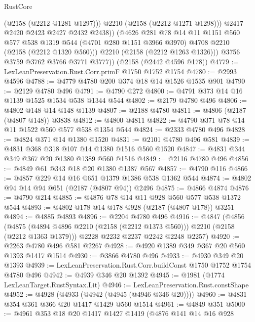 \begin{lexlean}{RustCore}
\begin{coremodule}
                  (@2158 (@2212 @1281 @1297)))
                @2210
                (@2158 (@2212 @1271 @1298)))
              @2417
              @2420
              @2423
              @2427
              @2432
              @2438))
          (@4626
            @281
            @78
            @14
            @11
            @1151
            @560
            @577
            @538
            @1319
            @544
            (@4701 @280 @1151 @3966 @3970)
            @4708
            @2210
            (@2158 (@2212 @1320 @560)))
          @2210
          (@2158 (@2212 @1263 @1326)))
        @3756
        @3759
        @3762
        @3766
        @3771
        @3777))
    (@2158 (@2442 @4596 @178))
@4779 := LexLeanPreservation.Rust.Corr.primF @1750 @1752 @1754
@4780 := @2993 @4596
@4788 := @4779 @4780 @200 @374 @18 @14 @1526 @1535 @901
@4790 := @2129 @4780 @496
@4791 := @4790 @272
@4800 := @4791 @373 @14 @16 @1139 @1525 @1534 @538 @1344 @544
@4802 := @2179 @4780 @496
@4806 := @4802 @148 @14 @148 @1139
@4807 := @2188 @4780
@4811 := @4806 (@2187 (@4807 @148)) @3838
@4812 := @4800 @4811
@4822 := @4790 @371 @78 @14 @11 @1522 @560 @577 @538 @1354 @544
@4824 := @2333 @4780 @496
@4828 := @4824 @371 @14 @1380 @1520
@4831 := @2101 @4780 @496 @581
@4839 := @4831 @368 @318 @107 @14 @1380 @1516 @560 @1520
@4847 := @4831 @344 @349 @367 @20 @1380 @1389 @560 @1516
@4849 := @2116 @4780 @496
@4856 := @4849 @61 @343 @18 @20 @1380 @1387 @567
@4857 := @4790 @116
@4866 := @4857 @229 @14 @16 @651 @1379 @1386 @538 @1362 @544
@4874 := @4802 @94 @14 @94 @651 (@2187 (@4807 @94)) @2496
@4875 := @4866 @4874
@4876 := @4790 @214
@4885 := @4876 @78 @14 @11 @928 @560 @577 @538 @1372 @544
@4893 := @4802 @178 @14 @178 @928 (@2187 (@4807 @178)) @3251
@4894 := @4885 @4893
@4896 := @2204 @4780 @496
@4916 := @4847
    (@4856
      (@4875 (@4894 @4896 @2210 (@2158 (@2212 @1373 @560))) @2210 (@2158 (@2212 @1363 @1379)))
      @2228
      @2232
      @2237
      @2242
      @2248
      @2257)
@4920 := @2263 @4780 @496 @581 @2267
@4928 := @4920 @1389 @349 @367 @20 @560 @1393 @1417 @1514
@4930 := @3866 @4780 @496
@4933 := @4930 @349 @20 @1393
@4939 := LexLeanPreservation.Rust.Corr.buildConst @1750 @1752 @1754 @4780 @496
@4942 := @4939 @346 @20 @1392
@4945 := @1981 (@1774 LexLeanTarget.RustSyntax.Lit)
@4946 := LexLeanPreservation.Rust.constShape
@4952 := @4928 (@4933 (@4942 (@4945 (@4946 @346 @20))))
@4960 := @4831 @354 @361 @366 @20 @1417 @1429 @560 @1514
@4961 := @4849 @351
@5000 := @4961
    @353
    @18
    @20
    @1417
    @1427
    @1419
    (@4876
      @141
      @14
      @16
      @928

\end{coremodule}
\end{lexlean}
